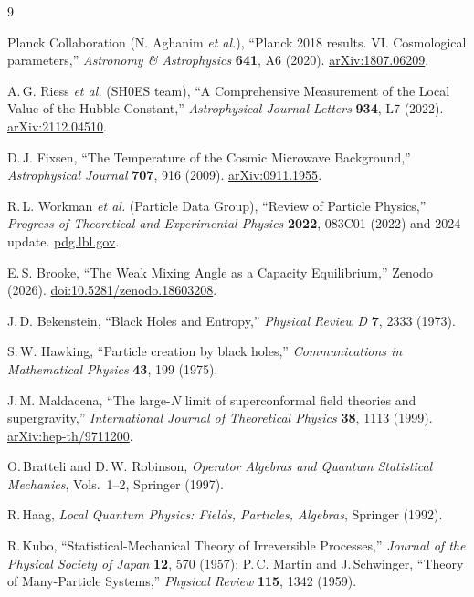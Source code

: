 \documentclass[11pt]{article}
\theoremstyle{plain}
\theoremstyle{definition}
\theoremstyle{remark}
\begin{document}
\begin{thebibliography}{9}

Planck Collaboration (N. Aghanim \textit{et al.}),
``Planck 2018 results. VI. Cosmological parameters,''
\textit{Astronomy \& Astrophysics} \textbf{641}, A6 (2020).
\href{https://arxiv.org/abs/1807.06209}{arXiv:1807.06209}.

A.\,G. Riess \textit{et al.} (SH0ES team),
``A Comprehensive Measurement of the Local Value of the Hubble Constant,''
\textit{Astrophysical Journal Letters} \textbf{934}, L7 (2022).
\href{https://arxiv.org/abs/2112.04510}{arXiv:2112.04510}.

D.\,J. Fixsen,
``The Temperature of the Cosmic Microwave Background,''
\textit{Astrophysical Journal} \textbf{707}, 916 (2009).
\href{https://arxiv.org/abs/0911.1955}{arXiv:0911.1955}.

R.\,L. Workman \textit{et al.} (Particle Data Group),
``Review of Particle Physics,''
\textit{Progress of Theoretical and Experimental Physics} \textbf{2022}, 083C01 (2022) and 2024 update.
\href{https://pdg.lbl.gov}{pdg.lbl.gov}.

E.\,S. Brooke,
``The Weak Mixing Angle as a Capacity Equilibrium,''
Zenodo (2026).
\href{https://doi.org/10.5281/zenodo.18603208}{doi:10.5281/zenodo.18603208}.

J.\,D. Bekenstein,
``Black Holes and Entropy,''
\textit{Physical Review D} \textbf{7}, 2333 (1973).

S.\,W. Hawking,
``Particle creation by black holes,''
\textit{Communications in Mathematical Physics} \textbf{43}, 199 (1975).

J.\,M. Maldacena,
``The large-$N$ limit of superconformal field theories and supergravity,''
\textit{International Journal of Theoretical Physics} \textbf{38}, 1113 (1999).
\href{https://arxiv.org/abs/hep-th/9711200}{arXiv:hep-th/9711200}.

O.\,Bratteli and D.\,W. Robinson,
\textit{Operator Algebras and Quantum Statistical Mechanics}, Vols.~1--2,
Springer (1997).

R.\,Haag,
\textit{Local Quantum Physics: Fields, Particles, Algebras},
Springer (1992).

R.\,Kubo,
``Statistical-Mechanical Theory of Irreversible Processes,''
\textit{Journal of the Physical Society of Japan} \textbf{12}, 570 (1957);
P.\,C. Martin and J.\,Schwinger,
``Theory of Many-Particle Systems,''
\textit{Physical Review} \textbf{115}, 1342 (1959).


\end{thebibliography}
\end{document}
